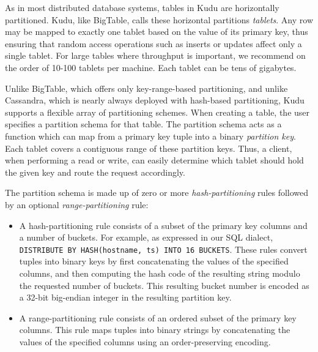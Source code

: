 \documentclass[twocolumn,9pt]{article}
\begin{document}
As in most distributed database systems, tables in Kudu are horizontally partitioned. Kudu, like
BigTable, calls these horizontal partitions {\em tablets}. Any row may be mapped to exactly one
tablet based on the value of its primary key, thus ensuring that random access operations such as
inserts or updates affect only a single tablet. For large tables where throughput is important, we
recommend on the order of 10-100 tablets per machine. Each tablet can be tens of gigabytes.

Unlike BigTable, which offers only key-range-based partitioning, and unlike Cassandra, which is
nearly always deployed with hash-based partitioning, Kudu supports a flexible array of partitioning
schemes. When creating a table, the user specifies a partition schema for that table. The partition schema
acts as a function which can map from a primary key tuple into a binary {\em partition key}. Each
tablet covers a contiguous range of these partition keys. Thus, a client, when performing a read or
write, can easily determine which tablet should hold the given key and route the request
accordingly.

The partition schema is made up of zero or more {\em hash-partitioning} rules followed by an
optional {\em range-partitioning} rule:
\begin{itemize}
\item A hash-partitioning rule consists of a subset of the primary key columns and a number of
  buckets. For example, as expressed in our SQL dialect, {\tt DISTRIBUTE BY HASH(hostname, ts) INTO
  16 BUCKETS}. These rules convert tuples into binary keys by first concatenating the values
  of the specified columns, and then computing the hash code of the resulting string
  modulo the requested number of buckets. This resulting bucket number is encoded as a 32-bit
  big-endian integer in the resulting partition key.

\item A range-partitioning rule consists of an ordered subset of the primary key columns. This
  rule maps tuples into binary strings by concatenating the values of the specified columns
  using an order-preserving encoding.
\end{itemize}

\end{document}
